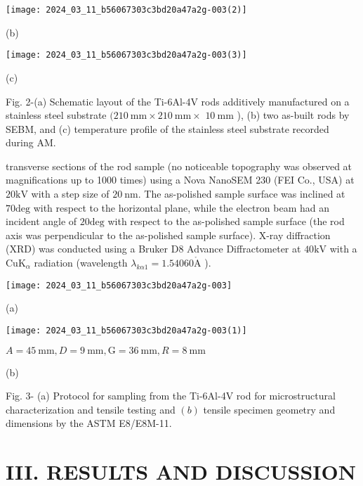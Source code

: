 \documentclass[10pt]{article}
\def\AA{\mathring{\mathrm{A}}}
\begin{document}
\begin{center}
\texttt{[image: 2024\_03\_11\_b56067303c3bd20a47a2g-003(2)]}
\end{center}

(b)

\begin{center}
\texttt{[image: 2024\_03\_11\_b56067303c3bd20a47a2g-003(3)]}
\end{center}

(c)

Fig. 2-(a) Schematic layout of the Ti-6Al-4V rods additively manufactured on a stainless steel substrate $(210 \mathrm{~mm} \times 210 \mathrm{~mm} \times$ $10 \mathrm{~mm}$ ), (b) two as-built rods by SEBM, and (c) temperature profile of the stainless steel substrate recorded during AM.

transverse sections of the rod sample (no noticeable topography was observed at magnifications up to 1000 times) using a Nova NanoSEM 230 (FEI Co., USA) at $20 \mathrm{kV}$ with a step size of $20 \mathrm{~nm}$. The as-polished sample surface was inclined at $70 \mathrm{deg}$ with respect to the horizontal plane, while the electron beam had an incident angle of $20 \mathrm{deg}$ with respect to the as-polished sample surface (the rod axis was perpendicular to the as-polished sample surface). X-ray diffraction (XRD) was conducted using a Bruker D8 Advance Diffractometer at $40 \mathrm{kV}$ with a $\mathrm{Cu} \mathrm{K}{ }_{\alpha}$ radiation (wavelength $\lambda_{k \alpha 1}=1.54060 \AA$ ).

\begin{center}
\texttt{[image: 2024\_03\_11\_b56067303c3bd20a47a2g-003]}
\end{center}

(a)

\begin{center}
\texttt{[image: 2024\_03\_11\_b56067303c3bd20a47a2g-003(1)]}
\end{center}

$A=45 \mathrm{~mm}, D=9 \mathrm{~mm}, \mathrm{G}=36 \mathrm{~mm}, R=8 \mathrm{~mm}$

(b)

Fig. 3- (a) Protocol for sampling from the Ti-6Al-4V rod for microstructural characterization and tensile testing and $(b)$ tensile specimen geometry and dimensions by the ASTM E8/E8M-11.

\section*{III. RESULTS AND DISCUSSION}
\end{document}
